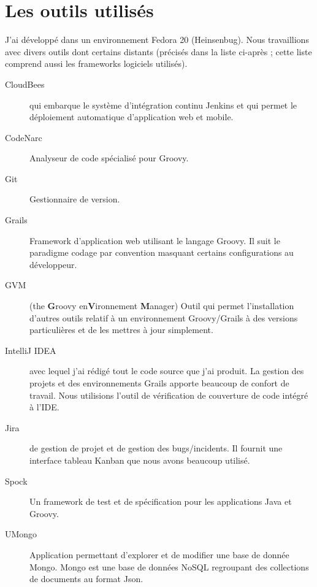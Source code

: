 \section{Les outils utilisés}
J'ai développé dans un environnement Fedora 20 (Heinsenbug).
Nous travaillions avec divers outils dont certains distants (précisés dans la
liste ci-après ; cette liste comprend aussi les frameworks logiciels utilisés).
\begin{description}
  \item[CloudBees]  qui embarque le système d'intégration continu
	Jenkins et qui permet le déploiement automatique d'application web et
	mobile.
  \item[CodeNarc] Analyseur de code spécialisé pour Groovy.
  \item[Git] Gestionnaire de version.
  \item[Grails] Framework d'application web utilisant le langage Groovy. Il suit
	le paradigme \og codage par convention \fg{} masquant certains
	configurations au développeur.
  \item[GVM] (the {\bf G}roovy en{\bf V}ironnement {\bf M}anager) Outil qui
	permet l'installation d'autres outils relatif à un environnement
	Groovy/Grails à des versions particulières et de les mettres à jour
	simplement.
  \item[IntelliJ IDEA]  avec lequel j'ai rédigé tout le code source
	que j'ai produit. La gestion des projets et des environnements Grails
	apporte beaucoup de confort de travail. Nous utilisions l'outil de
	vérification de couverture de code intégré à l'IDE.
  \item[Jira]  de gestion de projet et de gestion des bugs/incidents. Il
	fournit une interface \og tableau Kanban \fg{} que nous avons beaucoup utilisé.
  \item[Spock] Un framework de test et de spécification pour les applications
	Java et Groovy.
  \item[UMongo] Application permettant d'explorer et de modifier une base de
	donnée Mongo. Mongo est une base de données NoSQL regroupant des collections
	de documents au format Json.
\end{description}
